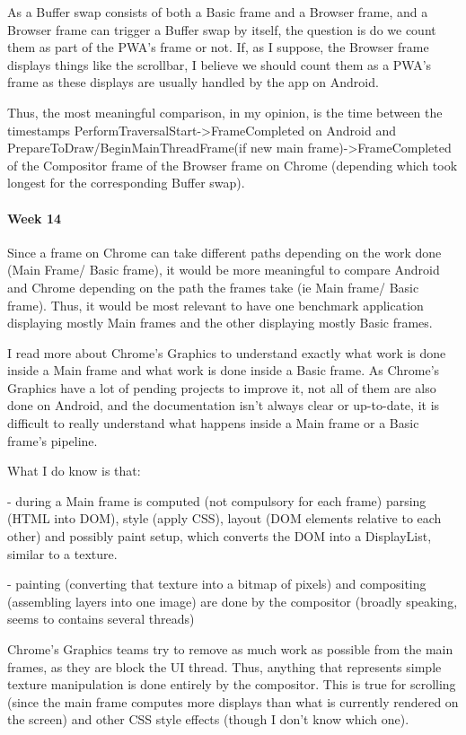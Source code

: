 \documentclass{kththesis}
\begin{document}
As a Buffer swap consists of both a Basic frame and a Browser frame, and a Browser frame can trigger a Buffer swap by itself, the question is do we count them as part of the PWA's frame or not. If, as I suppose, the Browser frame displays things like the scrollbar, I believe we should count them as a PWA's frame as these displays are usually handled by the app on Android. 

Thus, the most meaningful comparison, in my opinion, is the time between the timestamps PerformTraversalStart->FrameCompleted on Android and PrepareToDraw/BeginMainThreadFrame(if new main frame)->FrameCompleted of the Compositor frame of the Browser frame on Chrome (depending which took longest for the corresponding Buffer swap).

\paragraph{Week 14}
Since a frame on Chrome can take different paths depending on the work done (Main Frame/ Basic frame), it would be more meaningful to compare Android and Chrome depending on the path the frames take (ie Main frame/ Basic frame). Thus, it would be most relevant to have one benchmark application displaying mostly Main frames and the other displaying mostly Basic frames.

I read more about Chrome's Graphics to understand exactly what work is done inside a  Main frame and what work is done inside a Basic frame. As Chrome's Graphics have a lot of pending projects to improve it, not all of them are also done on Android, and the documentation isn't always clear or up-to-date, it is difficult to really understand what happens inside a Main frame or a Basic frame's pipeline.

What I do know is that:

    - during a Main frame is computed (not compulsory for each frame) parsing (HTML into DOM), style (apply CSS), layout (DOM elements relative to each other) and possibly paint setup, which converts the DOM into a DisplayList, similar to a texture.

    - painting (converting that texture into a bitmap of pixels) and compositing (assembling layers into one image) are done by the compositor (broadly speaking, seems to contains several threads)

Chrome's Graphics teams try to remove as much work as possible from the main frames, as they are block the UI thread. Thus, anything that represents simple texture manipulation is done entirely by the compositor. This is true for scrolling (since the main frame computes more displays than what is currently rendered on the screen) and other CSS style effects (though I don't know which one).
\end{document}
